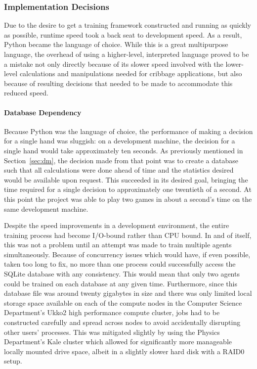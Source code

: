 
\subsubsection*{Implementation Decisions}
\label{sec:disc-future-implementation}

Due to the desire to get a training framework constructed
and running as quickly as possible,
runtime speed took a back seat to development speed.
%
As a result,
Python became the language of choice.
%
While this is a great multipurpose language,
the overhead of using a higher-level, interpreted language
proved to be a mistake
not only directly because of its slower speed involved with the
lower-level calculations and manipulations needed for cribbage applications,
but also because of resulting decisions that needed to be made to accommodate
this reduced speed.


\paragraph*{Database Dependency}

Because Python was the language of choice,
the performance of making a decision for a single hand was sluggish:
on a development machine,
the decision for a single hand would take approximately ten seconds.
%
As previously mentioned in Section~\ref{sec:dm},
the decision made from that point was to create a database such that all
calculations were done ahead of time
and the statistics desired would be available upon request.
%
This succeeded in its desired goal,
bringing the time required for a single decision to approximately
one twentieth of a second.
%
At this point the project was able to play two games in about a second's time
on the same development machine.

Despite the speed improvements in a development environment,
the entire training process had become I/O-bound rather
than CPU bound.
%
In and of itself,
this was not a problem until an attempt was made to train multiple
agents simultaneously.
%
Because of concurrency issues which would have,
if even possible,
taken too long to fix,
no more than one process could successfully access the SQLite database with any
consistency.
%
This would mean that only two agents could be trained on each database at any
given time.
%
Furthermore,
since this database file was around twenty gigabytes in size and
there was only limited local storage space available
on each of the compute nodes in the Computer Science Department's Ukko2 high
performance compute cluster,
jobs had to be constructed carefully and spread across nodes to avoid
accidentally disrupting other users' processes.
%
This was mitigated slightly by using the Physics Department's Kale cluster
which allowed for significantly more manageable locally mounted drive space,
albeit in a slightly slower hard disk with a RAID0 setup.

